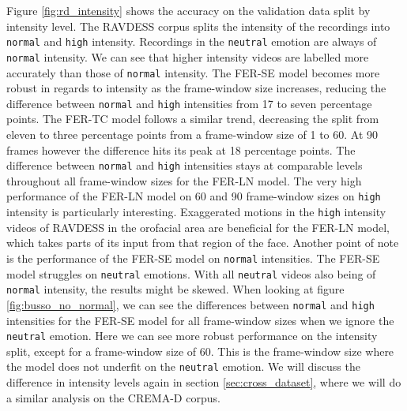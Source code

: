 Figure \ref{fig:rd_intensity} shows the accuracy on the validation data split by intensity level. The RAVDESS corpus splits the intensity of the recordings into \texttt{normal} and \texttt{high} intensity. Recordings in the \texttt{neutral} emotion are always of \texttt{normal} intensity. We can see that higher intensity videos are labelled more accurately than those of \texttt{normal} intensity. The FER-SE model becomes more robust in regards to intensity as the frame-window size increases, reducing the difference between \texttt{normal} and \texttt{high} intensities from 17 to seven percentage points. The FER-TC model follows a similar trend, decreasing the split from eleven to three percentage points from a frame-window size of 1 to 60. At 90 frames however the difference hits its peak at 18 percentage points. The difference between \texttt{normal} and \texttt{high} intensities stays at comparable levels throughout all frame-window sizes for the FER-LN model. The very high performance of the FER-LN model on 60 and 90 frame-window sizes on \texttt{high} intensity is particularly interesting. Exaggerated motions in the \texttt{high} intensity videos of RAVDESS in the orofacial area are beneficial for the FER-LN model, which takes parts of its input from that region of the face. Another point of note is the performance of the FER-SE model on \texttt{normal} intensities. The FER-SE model struggles on \texttt{neutral} emotions. With all \texttt{neutral} videos also being of \texttt{normal} intensity, the results might be skewed. When looking at figure \ref{fig:busso_no_normal}, we can see the differences between \texttt{normal} and \texttt{high} intensities for the FER-SE model for all frame-window sizes when we ignore the \texttt{neutral} emotion. Here we can see more robust performance on the intensity split, except for a frame-window size of 60. This is the frame-window size where the model does not underfit on the \texttt{neutral} emotion.
We will discuss the difference in intensity levels again in section \ref{sec:cross_dataset}, where we will do a similar analysis on the CREMA-D corpus.

